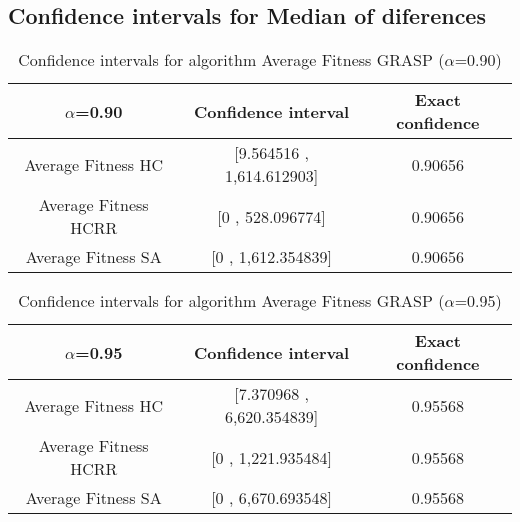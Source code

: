 \documentclass[a4paper,10pt]{article}
\begin{document}
\subsection{Confidence intervals for Median of diferences}

\begin{table}[!htp]
\centering\small
\begin{tabular}{
|c|c|c|}
\hline
 $\alpha$=0.90 & Confidence interval & Exact confidence \\ \hline 
Average Fitness HC       & [9.564516 , 1,614.612903] & 0.90656\\ \hline 
Average Fitness HCRR    & [0 , 528.096774] & 0.90656\\ \hline 
Average Fitness SA      & [0 , 1,612.354839] & 0.90656\\ \hline 

\end{tabular}
\caption{Confidence intervals for algorithm Average Fitness GRASP ($\alpha$=0.90)}
\end{table}
\begin{table}[!htp]
\centering\small
\begin{tabular}{
|c|c|c|}
\hline
 $\alpha$=0.95 & Confidence interval & Exact confidence \\ \hline 
Average Fitness HC       & [7.370968 , 6,620.354839] & 0.95568\\ \hline 
Average Fitness HCRR    & [0 , 1,221.935484] & 0.95568\\ \hline 
Average Fitness SA      & [0 , 6,670.693548] & 0.95568\\ \hline 

\end{tabular}
\caption{Confidence intervals for algorithm Average Fitness GRASP ($\alpha$=0.95)}
\end{table}

 \clearpage 
\end{document}
